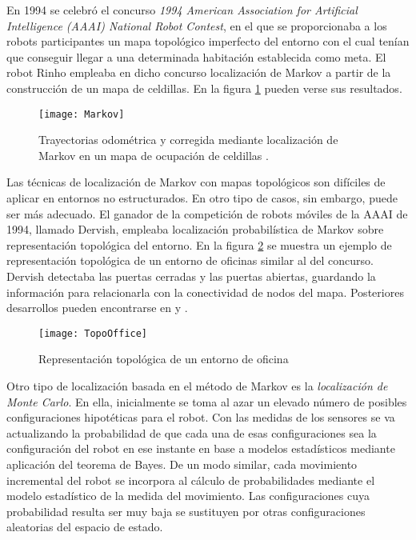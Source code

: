 En 1994 se celebró el concurso \emph{1994 American Association for Artificial Intelligence (AAAI) National Robot Contest}, en el que se proporcionaba a los robots participantes un mapa topológico imperfecto del entorno con el cual tenían que conseguir llegar a una determinada habitación establecida como meta. El robot Rinho empleaba en dicho concurso localización de Markov a partir de la construcción de un mapa de celdillas. En la figura \ref{fg:MarkovGrid} pueden verse sus resultados.

\begin{figure}[h]
  \centering\texttt{[image: Markov]}\\
  \caption{ Trayectorias odométrica y corregida mediante localización de Markov en un mapa de ocupación de celdillas \cite{Fox99}.}\label{fg:MarkovGrid}
\end{figure}

Las técnicas de localización de Markov con mapas topológicos son difíciles de aplicar en entornos no estructurados. En otro tipo de casos, sin embargo, puede ser más adecuado. El ganador de la competición de robots móviles de la AAAI de 1994, llamado Dervish, empleaba localización probabilística de Markov sobre representación topológica del entorno. En la figura \ref{fg:MarkovTop} se muestra un ejemplo de representación topológica de un entorno de oficinas similar al del concurso. Dervish detectaba las puertas cerradas y las puertas abiertas, guardando la información para relacionarla con la conectividad de nodos del mapa. Posteriores desarrollos pueden encontrarse en \cite{Simmons95} y \cite{Kaebling96}.

\begin{figure}[h]
  \centering\texttt{[image: TopoOffice]}\\
  \caption{Representación topológica de un entorno de oficina}\label{fg:MarkovTop}
\end{figure}


Otro tipo de localización basada en el método de Markov es la \emph{ localización de Monte Carlo}. En ella, inicialmente se toma al azar  un elevado número de posibles configuraciones hipotéticas para el robot. Con las medidas de los sensores se va actualizando la probabilidad de que cada una de esas configuraciones sea la configuración del robot en ese instante en base a modelos estadísticos mediante aplicación del teorema de Bayes. De un modo similar, cada movimiento incremental del robot se incorpora al cálculo de probabilidades mediante el modelo estadístico de la medida del movimiento. Las configuraciones cuya probabilidad resulta ser muy baja se sustituyen por otras configuraciones aleatorias del espacio de estado.

